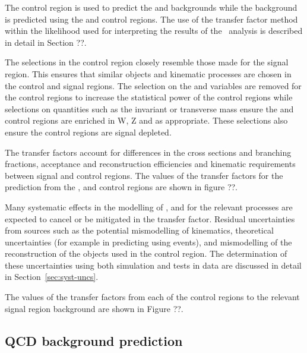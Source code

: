 The \mj control region is used to predict the \wj and \ttbar backgrounds while the
\znunu background is predicted using the \mmj and \gj control regions. The use of 
the transfer factor method within the likelihood used for interpreting the results of the
\alphat~analysis is described in detail in Section ??.

The selections in the control region closely resemble those made for
the signal region. This ensures that similar objects and kinematic processes
are chosen in the control and signal regions. The selection on the \alphat and
\bdphi variables are removed for the control regions to increase the statistical 
power of the control regions while selections on quantities such as the invariant
or transverse mass ensure the \mj and \mmj control regions are enriched in
W, Z and \ttbar as appropriate. These selections also ensure the control regions
are signal depleted.

The transfer factors account for differences in the cross sections and branching fractions,
acceptance and reconstruction efficiencies and kinematic requirements between signal 
and control regions. The values of the transfer factors for the prediction from the \mj,
\mmj and \gj control regions are shown in figure ??.

Many systematic effects in the modelling of \scalht, \nb and \njet for the relevant processes 
are expected to cancel or be mitigated in the transfer factor. Residual uncertainties from
sources such as the potential mismodelling of kinematics, theoretical uncertainties (for example
in predicting \znunu using \gj events), and mismodelling of the reconstruction of the objects
used in the control region. The determination of these uncertainties using both simulation 
and tests in data are discussed in detail in Section~\ref{sec:syst-uncs}.

The values of the transfer factors from each of the control regions to the relevant
signal region background are shown in Figure ??.



\subsection{QCD background prediction}

